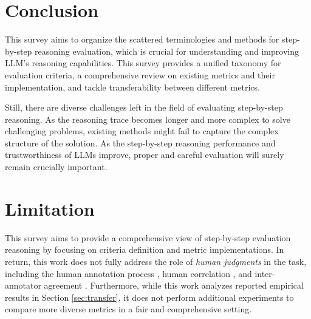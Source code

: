 \section{Conclusion}
\label{sec:conclusion}

This survey aims to organize the scattered terminologies and methods for step-by-step reasoning evaluation, which is crucial for understanding and improving LLM's reasoning capabilities. This survey provides a unified taxonomy for evaluation criteria, a comprehensive review on existing metrics and their implementation, and tackle transferability between different metrics.

Still, there are diverse challenges left in the field of evaluating step-by-step reasoning. As the reasoning trace becomes longer and more complex to solve challenging problems, existing methods might fail to capture the complex structure of the solution. As the step-by-step reasoning performance and trustworthiness of LLMs improve, proper and careful evaluation will surely remain crucially important.


\section{Limitation}

This survey aims to provide a comprehensive view of step-by-step evaluation reasoning by focusing on criteria definition and metric implementations. In return, this work does not fully address the role of \textit{human judgments} in the task, including the human annotation process \citep{DBLP:conf/iclr/LightmanKBEBLLS24, zheng2024processbenchidentifyingprocesserrors, song2025prmbenchfinegrainedchallengingbenchmark}, human correlation \citep{zha-etal-2023-alignscore, DBLP:conf/iclr/GolovnevaCPCZFC23, prasad-etal-2023-receval}, and inter-annotator agreement \citep{jacovi-etal-2024-chain}. Furthermore, while this work analyzes reported empirical results in Section \ref{sec:transfer}, it does not perform additional experiments to compare more diverse metrics in a fair and comprehensive setting.